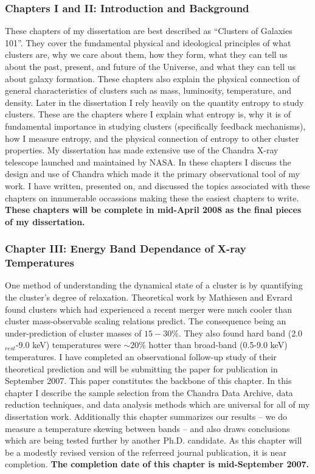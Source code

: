 \documentclass[12pt]{plan}
\begin{document}
\label{sec:ch12}
\subsubsection*{Chapters I and II: Introduction and Background}
These chapters of my dissertation are best described as ``Clusters of
Galaxies 101''. They cover the fundamental physical and ideological
principles of what clusters are, why we care about them, how they
form, what they can tell us about the past, present, and future of the
Universe, and what they can tell us about galaxy formation. These
chapters also explain the physical connection of general
characteristics of clusters such as mass, luminosity, 
temperature, and density. Later in the dissertation I rely heavily on the quantity
entropy to study clusters. These are the chapters where I explain what
entropy is, why it is of fundamental importance in studying clusters
(specifically feedback mechanisms), how I measure entropy, and the
physical connection of entropy to other cluster properties. My
dissertation has made extensive use of the Chandra X-ray telescope
launched and maintained by NASA. In these chapters I discuss the design
and use of Chandra which made it the primary observational tool of my
work. I have written, presented on, and discussed the topics
associated with these chapters on innumerable occassions making these the
easiest chapters to write. {\bf These chapters will be complete in
mid-April 2008 as the final pieces of my dissertation.} 

\label{sec:ch3}
\subsubsection*{Chapter III: Energy Band Dependance of X-ray
Temperatures}
One method of understanding the dynamical state of a cluster is by
quantifying the cluster's degree of relaxation. Theoretical work by
Mathiesen and Evrard\cite{2001ApJ...546..100M} found clusters which
had experienced a recent merger were much cooler than cluster
mass-observable scaling relations predict. The consequence being an
under-prediction of cluster masses of $15-30\%$. They also found hard
band (2.0$_{rest}$-9.0 keV) temperatures were $\sim 20\%$ hotter than
broad-band (0.5-9.0 keV) temperatures. I have completed an 
observational follow-up study of their theoretical prediction and will be
submitting the paper for publication in September 2007. This paper
constitutes the backbone of this chapter. In this chapter I
describe the sample selection from the Chandra Data Archive, data
reduction techniques, and data analysis methods which are universal for
all of my dissertation work. Additionally this chapter summarizes our
results -- we do measure a temperature skewing between bands -- and
also draws conclusions which are being tested further by another
Ph.D. candidate. As this chapter will be a modestly revised version of
the referreed journal publication, it is near completion. {\bf The 
completion date of this chapter is mid-September 2007.}
\end{document}
